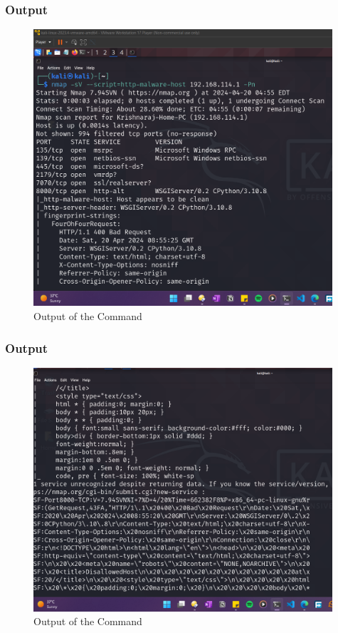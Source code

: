 \documentclass[11pt]{article}
\begin{document}
\subsubsection*{Output}
\begin{figure}[H]
    \centering
    \includegraphics[width=0.99\textwidth]{a3_ss (8).png}
    \caption{Output of the Command}
\end{figure}

\subsubsection*{Output}
\begin{figure}[H]
    \centering
    \includegraphics[width=0.99\textwidth]{a3_ss (9).png}
    \caption{Output of the Command}
\end{figure}
\end{document}
